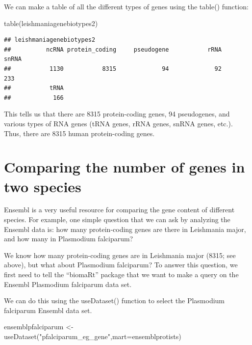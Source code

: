 \documentclass[
]{book}
\newenvironment{Shaded}{\begin{snugshade}}{\end{snugshade}}
\newcommand{\AttributeTok}[1]{\textcolor[rgb]{0.77,0.63,0.00}{#1}}
\newcommand{\FunctionTok}[1]{\textcolor[rgb]{0.00,0.00,0.00}{#1}}
\newcommand{\NormalTok}[1]{#1}
\newcommand{\OtherTok}[1]{\textcolor[rgb]{0.56,0.35,0.01}{#1}}
\newcommand{\StringTok}[1]{\textcolor[rgb]{0.31,0.60,0.02}{#1}}
\begin{document}
We can make a table of all the different types of genes using the table() function:

\begin{Shaded}
\begin{Highlighting}[]
\FunctionTok{table}\NormalTok{(leishmaniagenebiotypes2)}
\end{Highlighting}
\end{Shaded}

\begin{verbatim}
## leishmaniagenebiotypes2
##          ncRNA protein_coding     pseudogene           rRNA          snRNA 
##           1130           8315             94             92            233 
##           tRNA 
##            166
\end{verbatim}

This tells us that there are 8315 protein-coding genes, 94 pseudogenes, and various types of RNA genes (tRNA genes, rRNA genes, snRNA genes, etc.). Thus, there are 8315 human protein-coding genes.

\hypertarget{comparing-the-number-of-genes-in-two-species}{%
\chapter{Comparing the number of genes in two species}\label{comparing-the-number-of-genes-in-two-species}}

Ensembl is a very useful resource for comparing the gene content of different species. For example, one simple question that we can ask by analyzing the Ensembl data is: how many protein-coding genes are there in Leishmania major, and how many in Plasmodium falciparum?

We know how many protein-coding genes are in Leishmania major (8315; see above), but what about Plasmodium falciparum? To answer this question, we first need to tell the ``biomaRt'' package that we want to make a query on the Ensembl Plasmodium falciparum data set.

We can do this using the useDataset() function to select the Plasmodium falciparum Ensembl data set.

\begin{Shaded}
\begin{Highlighting}[]
\NormalTok{ensemblpfalciparum }\OtherTok{\textless{}{-}} \FunctionTok{useDataset}\NormalTok{(}\StringTok{"pfalciparum\_eg\_gene"}\NormalTok{,}\AttributeTok{mart=}\NormalTok{ensemblprotists)}
\end{Highlighting}
\end{Shaded}
\end{document}
